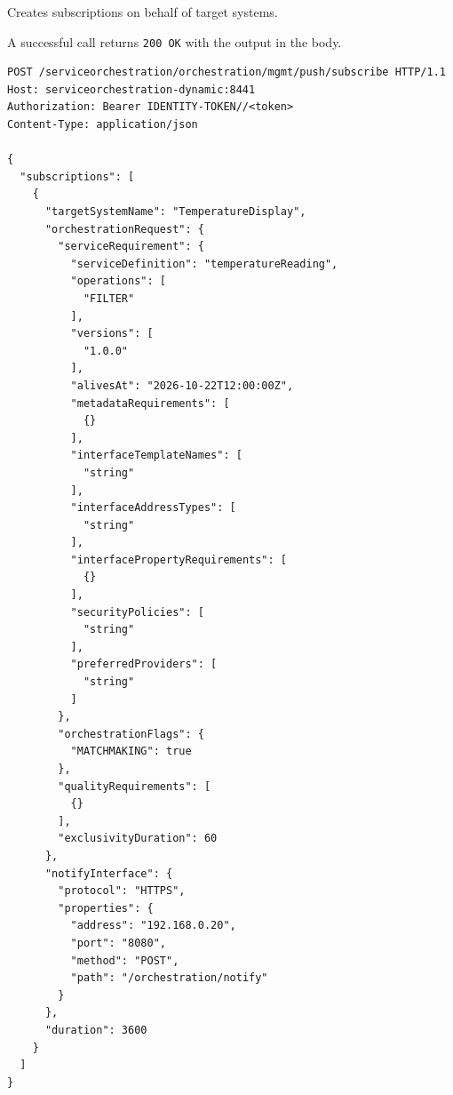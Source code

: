 \documentclass[a4paper]{arrowhead}
\newcommand{\oref}[1]{{\textcolor{ArrowheadBlue}{\hyperref[sec:operations:#1]{#1}}}}
\begin{document}
Creates subscriptions on behalf of target systems.

A successful call returns \texttt{200 OK} with the output in the body.

\begin{lstlisting}[label={lst:subscribe},caption={An \oref{subscribe} invocation.}]
POST /serviceorchestration/orchestration/mgmt/push/subscribe HTTP/1.1
Host: serviceorchestration-dynamic:8441
Authorization: Bearer IDENTITY-TOKEN//<token>
Content-Type: application/json

{
  "subscriptions": [
    {
      "targetSystemName": "TemperatureDisplay",
      "orchestrationRequest": {
        "serviceRequirement": {
          "serviceDefinition": "temperatureReading",
          "operations": [
            "FILTER"
          ],
          "versions": [
            "1.0.0"
          ],
          "alivesAt": "2026-10-22T12:00:00Z",
          "metadataRequirements": [
            {}
          ],
          "interfaceTemplateNames": [
            "string"
          ],
          "interfaceAddressTypes": [
            "string"
          ],
          "interfacePropertyRequirements": [
            {}
          ],
          "securityPolicies": [
            "string"
          ],
          "preferredProviders": [
            "string"
          ]
        },
        "orchestrationFlags": {
          "MATCHMAKING": true
        },
        "qualityRequirements": [
          {}
        ],
        "exclusivityDuration": 60
      },
      "notifyInterface": {
        "protocol": "HTTPS",
        "properties": {
          "address": "192.168.0.20",
          "port": "8080",
          "method": "POST",
          "path": "/orchestration/notify"
        }
      },
      "duration": 3600
    }
  ]
}
\end{lstlisting}
\end{document}
